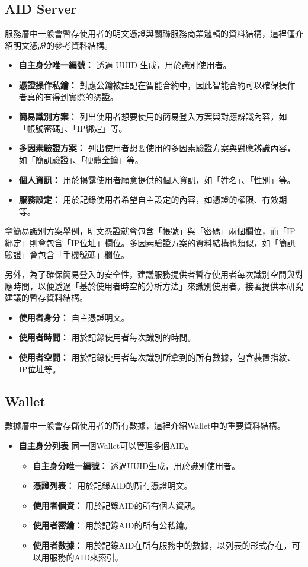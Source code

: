 \subsection{AID Server}
服務層中一般會暫存使用者的明文憑證與關聯服務商業邏輯的資料結構，這裡僅介紹明文憑證的參考資料結構。
\begin{itemize}
  \item \textbf{自主身分唯一編號：} 透過 UUID 生成，用於識別使用者。
  \item \textbf{憑證操作私鑰：} 對應公鑰被註記在智能合約中，因此智能合約可以確保操作者真的有得到實際的憑證。
  \item \textbf{簡易識別方案：} 列出使用者想要使用的簡易登入方案與對應辨識內容，如「帳號密碼」、「IP綁定」等。
  \item \textbf{多因素驗證方案：} 列出使用者想要使用的多因素驗證方案與對應辨識內容，如「簡訊驗證」、「硬體金鑰」等。
  \item \textbf{個人資訊：} 用於揭露使用者願意提供的個人資訊，如「姓名」、「性別」等。
  \item \textbf{服務設定：} 用於記錄使用者希望自主設定的內容，如憑證的權限、有效期等。
\end{itemize}
拿簡易識別方案舉例，明文憑證就會包含「帳號」與「密碼」兩個欄位，而「IP綁定」則會包含「IP位址」欄位。多因素驗證方案的資料結構也類似，如「簡訊驗證」會包含「手機號碼」欄位。

另外，為了確保簡易登入的安全性，建議服務提供者暫存使用者每次識別空間與對應時間，以便透過「基於使用者時空的分析方法」來識別使用者。接著提供本研究建議的暫存資料結構。
\begin{itemize}
  \item \textbf{使用者身分：} 自主憑證明文。
  \item \textbf{使用者時間：} 用於記錄使用者每次識別的時間。
  \item \textbf{使用者空間：} 用於記錄使用者每次識別所拿到的所有數據，包含裝置指紋、IP位址等。
\end{itemize}
\subsection{Wallet}
數據層中一般會存儲使用者的所有數據，這裡介紹Wallet中的重要資料結構。
\begin{itemize}
  \item \textbf{自主身分列表} 同一個Wallet可以管理多個AID。
        \begin{itemize}
          \item \textbf{自主身分唯一編號：} 透過UUID生成，用於識別使用者。
          \item \textbf{憑證列表：} 用於記錄AID的所有憑證明文。
          \item \textbf{使用者個資：} 用於記錄AID的所有個人資訊。
          \item \textbf{使用者密鑰：} 用於記錄AID的所有公私鑰。
          \item \textbf{使用者數據：} 用於記錄AID在所有服務中的數據，以列表的形式存在，可以用服務的AID來索引。
        \end{itemize}
\end{itemize}
